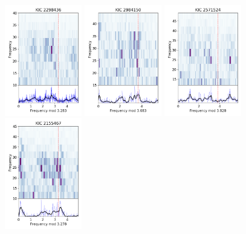 \begin{figure}
    \centering
        \includegraphics[width=0.3\textwidth]{Chapter5/2298436_echelle.png}
        \includegraphics[width=0.3\textwidth]{Chapter5/2984150_echelle.png}
        \includegraphics[width=0.3\textwidth]{Chapter5/2571524_echelle.png}
        \includegraphics[width=0.3\textwidth]{Chapter5/2155467_echelle.png}

\end{figure}
